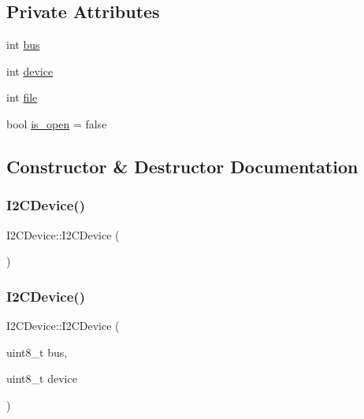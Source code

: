 \subsection*{Private Attributes}
\begin{DoxyCompactItemize}
\item 
int \hyperlink{classcubesat_1_1I2CDevice_acc13c6328bb7f29ddc5b9436d6b40816}{bus}
\item 
int \hyperlink{classcubesat_1_1I2CDevice_a59cdefbd8b9720d194254c617f5c9b07}{device}
\item 
int \hyperlink{classcubesat_1_1I2CDevice_aea3a1fc10a89f78e12f6a905dfa7deb1}{file}
\item 
bool \hyperlink{classcubesat_1_1I2CDevice_a6d247df5f1726283a1783810305c2699}{is\+\_\+open} = false
\end{DoxyCompactItemize}


\subsection{Constructor \& Destructor Documentation}
\mbox{\label{classcubesat_1_1I2CDevice_afa6d28cbaab65cfc2ad60a63bc95d30d}} 
\subsubsection{\texorpdfstring{I2\+C\+Device()}{I2CDevice()}\hspace{0.1cm}{\footnotesize\ttfamily [1/2]}}
{\footnotesize\ttfamily I2\+C\+Device\+::\+I2\+C\+Device (\begin{DoxyParamCaption}{ }\end{DoxyParamCaption})}

\mbox{\label{classcubesat_1_1I2CDevice_a9fad0233c906bdbbe9b66ceaacfbb35e}} 
\subsubsection{\texorpdfstring{I2\+C\+Device()}{I2CDevice()}\hspace{0.1cm}{\footnotesize\ttfamily [2/2]}}
{\footnotesize\ttfamily I2\+C\+Device\+::\+I2\+C\+Device (\begin{DoxyParamCaption}\item[{uint8\+\_\+t}]{bus,  }\item[{uint8\+\_\+t}]{device }\end{DoxyParamCaption})}

